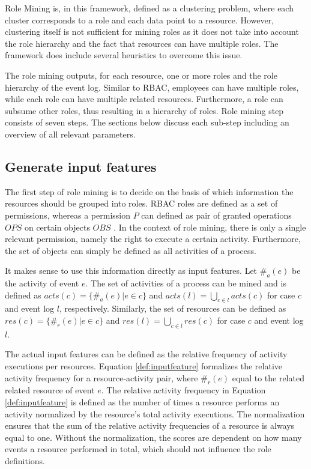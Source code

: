 Role Mining is, in this framework, defined as a clustering problem, where each cluster corresponds to a role and each data point to a resource. However, clustering itself is not sufficient for mining roles as it does not take into account the role hierarchy and the fact that resources can have multiple roles. The framework does include several heuristics to overcome this issue. 

The role mining outputs, for each resource, one or more roles and the role hierarchy of the event log. Similar to RBAC, employees can have multiple roles, while each role can have multiple related resources. Furthermore, a role can subsume other roles, thus resulting in a hierarchy of roles. Role mining step consists of seven steps. The sections below discuss each sub-step including an overview of all relevant parameters. 

\subsection{Generate input features}
The first step of role mining is to decide on the basis of which information the resources should be grouped into roles. RBAC roles are defined as a set of  permissions, whereas a permission $P$ can defined as pair of granted operations $OPS$ on certain objects $OBS$ \cite{rbac2, rbac}. In the context of role mining, there is only a single relevant permission, namely the right to execute a certain activity. Furthermore, the set of objects can simply be defined as all activities of a process. 

It makes sense to use this information directly as input features. Let $\#_{a}(e)$ be the activity of event $e$. The set of activities of a process can be mined and is defined as $acts(c) = \{\#_{a}(e) | e \in c\}$ and $acts(l) = \bigcup_{c \in l} acts(c)$ for case $c$ and event log $l$, respectively. Similarly, the set of resources can be defined as $res(c) = \{\#_{r}(e) | e \in c\}$ and $res(l) = \bigcup_{c \in l} res(c)$ for case $c$ and event log $l$.  

The actual input features can be defined as the relative frequency of activity executions per resources. Equation \ref{def:inputfeature} formalizes the relative activity frequency for a resource-activity pair, where $\#_{r}(e)$ equal to the related  related resource of event $e$. The relative activity frequency in Equation \ref{def:inputfeature} is defined as the number of times a resource performs an activity normalized by the resource's total activity executions. The normalization ensures that the sum of the relative activity frequencies of a resource is always equal to one. Without the normalization, the scores are dependent on how many events a resource performed in total, which should not influence the role definitions. 

